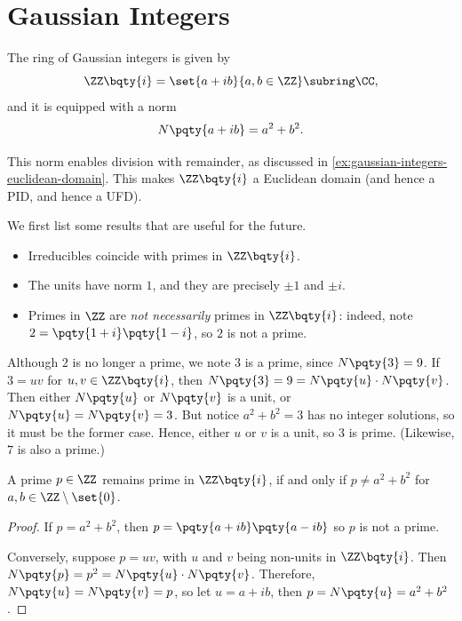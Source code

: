\section{Gaussian Integers}

The ring of Gaussian integers is given by
\[
    \ZZ\bqty{i} = \set{a + ib}{a, b \in \ZZ} \subring \CC,
\]
and it is equipped with a norm
\[
    N\pqty{a + ib} = a^2 + b^2.
\]

This norm enables division with remainder, as discussed in \autoref{ex:gaussian-integers-euclidean-domain}. This makes \(\ZZ\bqty{i}\) a Euclidean domain (and hence a PID, and hence a UFD).

We first list some results that are useful for the future.

\begin{proposition}
    \label{prop:properties-gaussian-integers}%
    \begin{itemize}
        \item Irreducibles coincide with primes in \(\ZZ\bqty{i}\).
        \item The units have norm \(1\), and they are precisely \(\pm 1\) and \(\pm i\).
        \item Primes in \(\ZZ\) are \emph{not necessarily} primes in \(\ZZ\bqty{i}\): indeed, note \(2 = \pqty{1 + i} \pqty{1 - i}\), so \(2\) is not a prime.    
    \end{itemize}
\end{proposition}

Although \(2\) is no longer a prime, we note \(3\) is a prime, since \(N\pqty{3} = 9\). If \(3 = uv\) for \(u, v \in \ZZ\bqty{i}\), then \(N\pqty{3} = 9 = N\pqty{u} \cdot N\pqty{v}\). Then either \(N\pqty{u}\) or \(N\pqty{v}\) is a unit, or \(N\pqty{u} = N\pqty{v} = 3\). But notice \(a^2 + b^2 = 3\) has no integer solutions, so it must be the former case. Hence, either \(u\) or \(v\) is a unit, so \(3\) is prime. (Likewise, \(7\) is also a prime.)

\begin{proposition}
    \label{prop:prime-gaussian-int-int}%
    A prime \(p \in \ZZ\) remains prime in \(\ZZ\bqty{i}\), if and only if \(p \neq a^2 + b^2\) for \(a, b \in \ZZ \setminus \set{0}\).
\end{proposition}

\begin{proof}
    If \(p = a^2 + b^2\), then \(p = \pqty{a + ib} \pqty{a - ib}\) so \(p\) is not a prime.

    Conversely, suppose \(p = uv\), with \(u\) and \(v\) being non-units in \(\ZZ\bqty{i}\). Then \(N\pqty{p} = p^2 = N\pqty{u} \cdot N\pqty{v}\). Therefore, \(N\pqty{u} = N\pqty{v} = p\), so let \(u = a + ib\), then \(p = N\pqty{u} = a^2 + b^2\).
\end{proof} 

